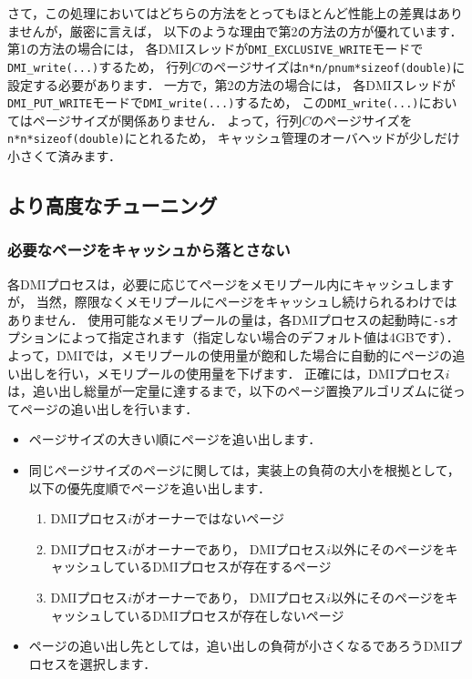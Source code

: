 \documentclass[report,12pt]{jsbook}
\begin{document}
さて，この処理においてはどちらの方法をとってもほとんど性能上の差異はありませんが，厳密に言えば，
以下のような理由で第2の方法の方が優れています．
第1の方法の場合には，
各DMIスレッドが\texttt{DMI\_EXCLUSIVE\_WRITE}モードで\texttt{DMI\_write(...)}するため，
行列$C$のページサイズは\texttt{n*n/pnum*sizeof(double)}に設定する必要があります．
一方で，第2の方法の場合には，
各DMIスレッドが\texttt{DMI\_PUT\_WRITE}モードで\texttt{DMI\_write(...)}するため，
この\texttt{DMI\_write(...)}においてはページサイズが関係ありません．
よって，行列$C$のページサイズを\texttt{n*n*sizeof(double)}にとれるため，
キャッシュ管理のオーバヘッドが少しだけ小さくて済みます．

\subsection{より高度なチューニング}

\subsubsection{必要なページをキャッシュから落とさない}

各DMIプロセスは，必要に応じてページをメモリプール内にキャッシュしますが，
当然，際限なくメモリプールにページをキャッシュし続けられるわけではありません．
使用可能なメモリプールの量は，各DMIプロセスの起動時に\texttt{-s}オプションによって指定されます（指定しない場合のデフォルト値は4GBです）．
よって，DMIでは，メモリプールの使用量が飽和した場合に自動的にページの追い出しを行い，メモリプールの使用量を下げます．
正確には，DMIプロセス$i$は，追い出し総量が一定量に達するまで，以下のページ置換アルゴリズムに従ってページの追い出しを行います．
\begin{itemize}
\item ページサイズの大きい順にページを追い出します．
\item 同じページサイズのページに関しては，実装上の負荷の大小を根拠として，以下の優先度順でページを追い出します．
  \begin{enumerate}
  \item DMIプロセス$i$がオーナーではないページ
  \item DMIプロセス$i$がオーナーであり，
    DMIプロセス$i$以外にそのページをキャッシュしているDMIプロセスが存在するページ
  \item DMIプロセス$i$がオーナーであり，
    DMIプロセス$i$以外にそのページをキャッシュしているDMIプロセスが存在しないページ
  \end{enumerate}
\item ページの追い出し先としては，追い出しの負荷が小さくなるであろうDMIプロセスを選択します．
\end{itemize}
\end{document}
